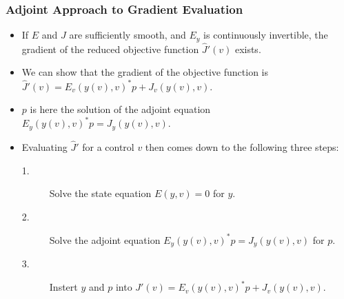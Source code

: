 \documentclass[9pt]{beamer}
\begin{document}
\begin{frame}
\frametitle{Adjoint Approach to Gradient Evaluation}
\begin{itemize}
\item{If $E$ and $J$ are sufficiently smooth, and $E_y$ is continuously invertible, the gradient of the reduced objective function $\hat J'(v)$ exists.}
\item{We can show that the gradient of the objective function is $\hat J'(v)=E_v(y(v),v)^*p +J_v(y(v),v)$. }
\item{$p$ is here the solution of the adjoint equation $E_y(y(v),v)^*p = J_y(y(v),v)$.}
\item{Evaluating $\hat J'$ for a control $v$ then comes down to the following three steps:
\begin{description}
\item[1.]{Solve the state equation $E(y,v)=0$ for $y$.}
\item[2.]{Solve the adjoint equation $E_y(y(v),v)^*p = J_y(y(v),v)$ for $p$.}
\item[3.]{Instert $y$ and $p$ into $J'(v)=E_v(y(v),v)^*p +J_v(y(v),v)$.}
\end{description}}
\end{itemize}
\end{frame}
\end{document}
